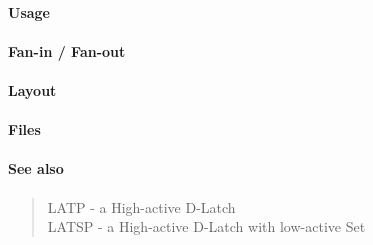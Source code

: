 \paragraph{Usage}

\paragraph{Fan-in / Fan-out}

\paragraph{Layout}

\paragraph{Files}

\paragraph{See also}
\begin{quote}
    LATP - a High-active D-Latch \\
    LATSP - a High-active D-Latch with low-active Set
\end{quote}
